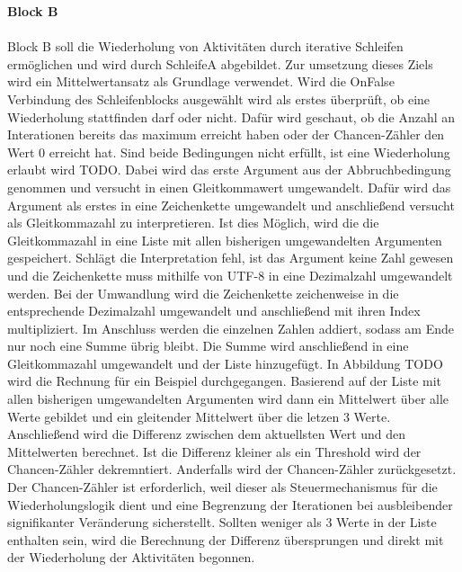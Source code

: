     \textbf{Block B}\\
    \\
    Block B soll die Wiederholung von Aktivitäten durch iterative Schleifen ermöglichen und wird durch SchleifeA abgebildet.
    Zur umsetzung dieses Ziels wird ein Mittelwertansatz als Grundlage verwendet.
    Wird die OnFalse Verbindung des Schleifenblocks ausgewählt wird als erstes überprüft, ob eine Wiederholung stattfinden darf oder nicht.
    Dafür wird geschaut, ob die Anzahl an Interationen bereits das maximum erreicht haben oder der Chancen-Zähler den Wert 0 erreicht hat.
    Sind beide Bedingungen nicht erfüllt, ist eine Wiederholung erlaubt wird TODO.
    Dabei wird das erste Argument aus der Abbruchbedingung genommen und versucht in einen Gleitkommawert umgewandelt. %
    Dafür wird das Argument als erstes in eine Zeichenkette umgewandelt und anschließend versucht als Gleitkommazahl zu interpretieren.
    Ist dies Möglich, wird die die Gleitkommazahl in eine Liste mit allen bisherigen umgewandelten Argumenten gespeichert.
    Schlägt die Interpretation fehl, ist das Argument keine Zahl gewesen und die Zeichenkette muss mithilfe von UTF-8 in eine Dezimalzahl umgewandelt werden.
    Bei der Umwandlung wird die Zeichenkette zeichenweise in die entsprechende Dezimalzahl umgewandelt und anschließend mit ihren Index multipliziert.
    Im Anschluss werden die einzelnen Zahlen addiert, sodass am Ende nur noch eine Summe übrig bleibt.
    Die Summe wird anschließend in eine Gleitkommazahl umgewandelt und der Liste hinzugefügt.
    In Abbildung TODO wird die Rechnung für ein Beispiel durchgegangen.
    Basierend auf der Liste mit allen bisherigen umgewandelten Argumenten wird dann ein Mittelwert über alle Werte gebildet und ein gleitender Mittelwert über die letzen 3 Werte.
    Anschließend wird die Differenz zwischen dem aktuellsten Wert und den Mittelwerten berechnet. 
    Ist die Differenz kleiner als ein Threshold wird der Chancen-Zähler dekremntiert. 
    Anderfalls wird der Chancen-Zähler zurückgesetzt.
    Der Chancen-Zähler ist erforderlich, weil dieser als Steuermechanismus für die Wiederholungslogik dient und eine Begrenzung der Iterationen bei ausbleibender signifikanter Veränderung sicherstellt.
    Sollten weniger als 3 Werte in der Liste enthalten sein, wird die Berechnung der Differenz übersprungen und direkt mit der Wiederholung der Aktivitäten begonnen.
